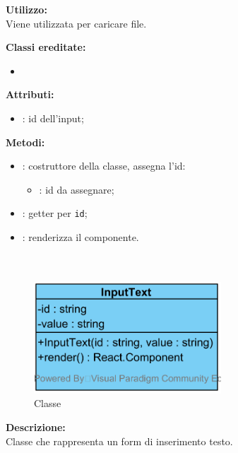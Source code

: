 \textbf{Utilizzo:}\\
Viene utilizzata per caricare file.

\textbf{Classi ereditate:}
\begin{itemize}
	\item {}
\end{itemize}


\textbf{Attributi:}
\begin{itemize}
	\item {}: id dell'input;
\end{itemize}

\textbf{Metodi:}
\begin{itemize}
	\item {}: costruttore della classe, assegna l'id:
	\begin{itemize}
		\item {}: id da assegnare;
	\end{itemize}
	\item {}: getter per \texttt{id};
	\item {}: renderizza il componente.
\end{itemize}

\paragraph[::InputText]{\class}\mbox{}\\ \label{\class}
\begin{figure}[H]
	\centering
	\includegraphics[width=7cm]{./diagrammi/framework/view/gui/inputtext.png}
	\caption{Classe \class}
\end{figure}
\textbf{Descrizione:}\\
Classe che rappresenta un form di inserimento testo.

